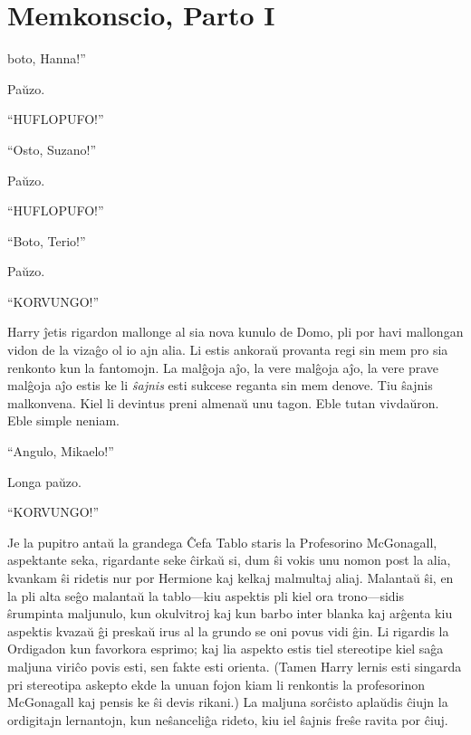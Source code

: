 \chapter{Memkonscio, Parto I}

boto, Hanna!''

\hplettrineextrapara
Paŭzo.

``HUFLOPUFO!''

``Osto, Suzano!''

Paŭzo.

``HUFLOPUFO!''

``Boto, Terio!''

Paŭzo.

``KORVUNGO!''

Harry ĵetis rigardon mallonge al sia nova kunulo de Domo, pli por havi
mallongan vidon de la vizaĝo ol io ajn alia. Li estis ankoraŭ provanta
regi sin mem pro sia renkonto kun la fantomojn. La malĝoja aĵo, la
vere malĝoja aĵo, la vere prave malĝoja aĵo estis ke li \emph{ŝajnis}
esti sukcese reganta sin mem denove. Tiu ŝajnis malkonvena. Kiel li
devintus preni almenaŭ unu tagon. Eble tutan vivdaŭron. Eble simple
neniam.

``Angulo, Mikaelo!''

Longa paŭzo.

``KORVUNGO!''

Je la pupitro antaŭ la grandega Ĉefa Tablo staris la Profesorino
McGonagall, aspektante seka, rigardante seke ĉirkaŭ si, dum ŝi vokis
unu nomon post la alia, kvankam ŝi ridetis nur por Hermione kaj kelkaj
malmultaj aliaj. Malantaŭ ŝi, en la pli alta seĝo malantaŭ la
tablo—kiu aspektis pli kiel ora trono—sidis ŝrumpinta maljunulo, kun
okulvitroj kaj kun barbo inter blanka kaj arĝenta kiu aspektis kvazaŭ ĝi
preskaŭ irus al la grundo se oni povus vidi ĝin. Li rigardis la
Ordigadon kun favorkora esprimo; kaj lia aspekto estis tiel stereotipe
kiel saĝa maljuna viriĉo povis esti, sen fakte esti orienta. (Tamen
Harry lernis esti singarda pri stereotipa askepto ekde la unuan fojon
kiam li renkontis la profesorinon McGonagall kaj pensis ke ŝi devis
rikani.) La maljuna sorĉisto aplaŭdis ĉiujn la ordigitajn lernantojn,
kun neŝanceliĝa rideto, kiu iel ŝajnis freŝe ravita por ĉiuj.

